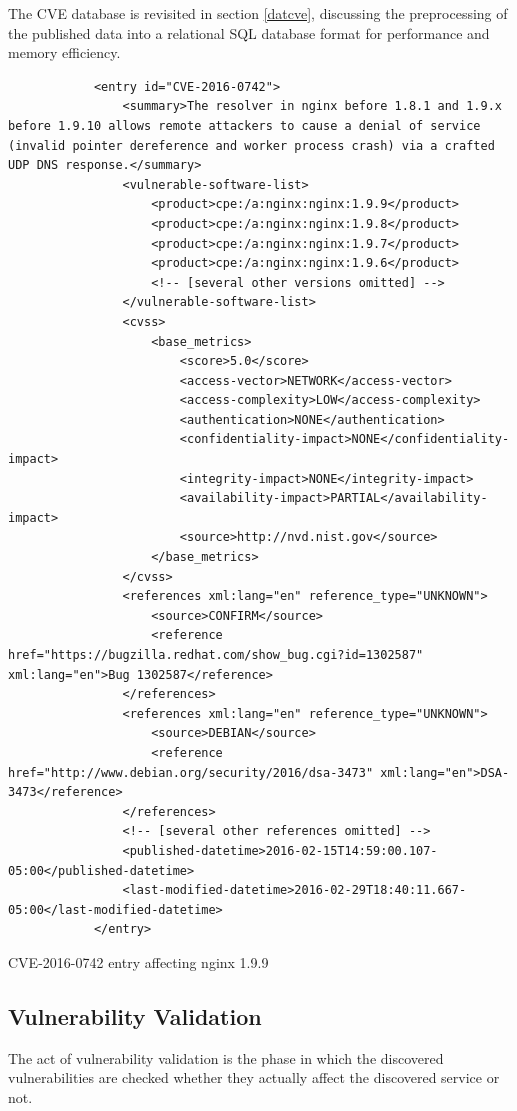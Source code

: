 \documentclass[a4paper,12pt]{article}
\begin{document}
	The CVE database is revisited in section \ref{datcve}, discussing the preprocessing of the published data into a relational SQL database format for performance and memory efficiency.
	
	\begin{listing}[H]
		\begin{verbatim}
			<entry id="CVE-2016-0742">
				<summary>The resolver in nginx before 1.8.1 and 1.9.x before 1.9.10 allows remote attackers to cause a denial of service (invalid pointer dereference and worker process crash) via a crafted UDP DNS response.</summary>
				<vulnerable-software-list>
					<product>cpe:/a:nginx:nginx:1.9.9</product>
					<product>cpe:/a:nginx:nginx:1.9.8</product>
					<product>cpe:/a:nginx:nginx:1.9.7</product>
					<product>cpe:/a:nginx:nginx:1.9.6</product>
					<!-- [several other versions omitted] -->
				</vulnerable-software-list>
				<cvss>
					<base_metrics>
						<score>5.0</score>
						<access-vector>NETWORK</access-vector>
						<access-complexity>LOW</access-complexity>
						<authentication>NONE</authentication>
						<confidentiality-impact>NONE</confidentiality-impact>
						<integrity-impact>NONE</integrity-impact>
						<availability-impact>PARTIAL</availability-impact>
						<source>http://nvd.nist.gov</source>
					</base_metrics>
				</cvss>
				<references xml:lang="en" reference_type="UNKNOWN">
					<source>CONFIRM</source>
					<reference href="https://bugzilla.redhat.com/show_bug.cgi?id=1302587" xml:lang="en">Bug 1302587</reference>
				</references>
				<references xml:lang="en" reference_type="UNKNOWN">
					<source>DEBIAN</source>
					<reference href="http://www.debian.org/security/2016/dsa-3473" xml:lang="en">DSA-3473</reference>
				</references>
				<!-- [several other references omitted] -->
				<published-datetime>2016-02-15T14:59:00.107-05:00</published-datetime>
				<last-modified-datetime>2016-02-29T18:40:11.667-05:00</last-modified-datetime>
			</entry>
		\end{verbatim}
		\caption{CVE-2016-0742 entry affecting nginx 1.9.9}
		\label{nginxcve}
	\end{listing}
	
\subsection{Vulnerability Validation} \label{vulnvalid}
 

	The act of vulnerability validation is the phase in which the discovered vulnerabilities are checked whether they actually affect the discovered service or not.
	
\end{document}

